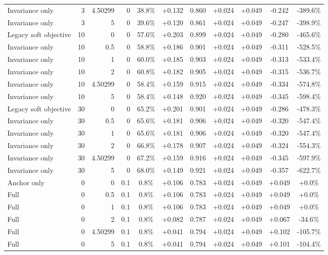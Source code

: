 \begin{table}[htbp]
\begin{tabular}{lrrrccccccc}
Invariance only & 3 & 4.50299 & 0 & 38.8\% & +0.132 & 0.860 & +0.024 & +0.049 & -0.242 & -389.6\% \\
Invariance only & 3 & 5 & 0 & 39.6\% & +0.120 & 0.861 & +0.024 & +0.049 & -0.247 & -398.9\% \\
Legacy soft objective & 10 & 0 & 0 & 57.6\% & +0.203 & 0.899 & +0.024 & +0.049 & -0.280 & -465.6\% \\
Invariance only & 10 & 0.5 & 0 & 58.8\% & +0.186 & 0.901 & +0.024 & +0.049 & -0.311 & -528.5\% \\
Invariance only & 10 & 1 & 0 & 60.0\% & +0.185 & 0.903 & +0.024 & +0.049 & -0.313 & -533.4\% \\
Invariance only & 10 & 2 & 0 & 60.8\% & +0.182 & 0.905 & +0.024 & +0.049 & -0.315 & -536.7\% \\
Invariance only & 10 & 4.50299 & 0 & 58.4\% & +0.159 & 0.915 & +0.024 & +0.049 & -0.334 & -574.8\% \\
Invariance only & 10 & 5 & 0 & 58.4\% & +0.148 & 0.920 & +0.024 & +0.049 & -0.345 & -598.4\% \\
Legacy soft objective & 30 & 0 & 0 & 65.2\% & +0.201 & 0.901 & +0.024 & +0.049 & -0.286 & -478.3\% \\
Invariance only & 30 & 0.5 & 0 & 65.6\% & +0.181 & 0.906 & +0.024 & +0.049 & -0.320 & -547.4\% \\
Invariance only & 30 & 1 & 0 & 65.6\% & +0.181 & 0.906 & +0.024 & +0.049 & -0.320 & -547.4\% \\
Invariance only & 30 & 2 & 0 & 66.8\% & +0.178 & 0.907 & +0.024 & +0.049 & -0.324 & -554.3\% \\
Invariance only & 30 & 4.50299 & 0 & 67.2\% & +0.159 & 0.916 & +0.024 & +0.049 & -0.345 & -597.9\% \\
Invariance only & 30 & 5 & 0 & 68.0\% & +0.149 & 0.921 & +0.024 & +0.049 & -0.357 & -622.7\% \\
Anchor only & 0 & 0 & 0.1 & 0.8\% & +0.106 & 0.783 & +0.024 & +0.049 & +0.049 & +0.0\% \\
Full & 0 & 0.5 & 0.1 & 0.8\% & +0.106 & 0.783 & +0.024 & +0.049 & +0.049 & +0.0\% \\
Full & 0 & 1 & 0.1 & 0.8\% & +0.106 & 0.783 & +0.024 & +0.049 & +0.049 & +0.0\% \\
Full & 0 & 2 & 0.1 & 0.8\% & +0.082 & 0.787 & +0.024 & +0.049 & +0.067 & -34.6\% \\
Full & 0 & 4.50299 & 0.1 & 0.8\% & +0.041 & 0.794 & +0.024 & +0.049 & +0.102 & -105.7\% \\
Full & 0 & 5 & 0.1 & 0.8\% & +0.041 & 0.794 & +0.024 & +0.049 & +0.101 & -104.4\% \\

\end{tabular}
\end{table}
